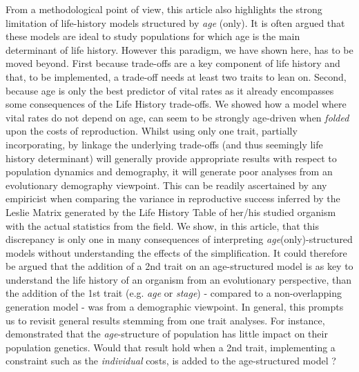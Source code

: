 \documentclass[10pt,a4paper]{article}
\newcommand{\PCoR}{\emph{individual} costs}
\begin{document}
From a methodological point of view, this article also highlights the strong limitation of life-history models structured by \emph{age} (only). It is often argued that these models are ideal to study populations for which age is the main determinant of life history. However this paradigm, we have shown here, has to be moved beyond. First because trade-offs are a key component of life history and that, to be implemented, a trade-off needs at least two traits to lean on. Second, because age is only the best predictor of vital rates as it already encompasses some consequences of the Life History trade-offs. We showed how a model where vital rates do not depend on age, can seem to be strongly age-driven when \emph{folded} upon the costs of reproduction. Whilst using only one trait, partially incorporating, by linkage the underlying trade-offs (and thus seemingly life history determinant) will generally provide appropriate results with respect to population dynamics and demography, it will generate poor analyses from an evolutionary demography viewpoint. This can be readily ascertained by any empiricist when comparing the variance in reproductive success inferred by the Leslie Matrix generated by the Life History Table of her/his studied organism with the actual statistics from the field. We show, in this article, that this discrepancy is only one in many consequences of interpreting \emph{age}(only)-structured models without understanding the effects of the simplification.
It could therefore be argued that the addition of a 2nd trait on an age-structured model is as key to understand the life history of an organism from an evolutionary perspective, than the addition of the 1st trait (e.g. \emph{age} or \emph{stage}) - compared to a non-overlapping generation model - was from a demographic viewpoint. In general, this prompts us to revisit general results stemming from one trait analyses. For instance,  demonstrated that the \emph{age}-structure of population has little impact on their population genetics. Would that result hold when a 2nd trait, implementing a constraint such as the \PCoR, is added to the age-structured model ? \\
\end{document}
